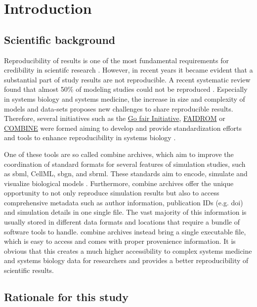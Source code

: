 \section*{Introduction}

\subsection*{Scientific background}
Reproducibility of results is one of the most fundamental requirements for credibility in scientifc research \cite{tiwari2021reproducibility}. However, in recent years it became evident that a substantial part of study results are not reproducible. A recent systematic review found that almost 50\% of modeling studies could not be reproduced \cite{tiwari2021reproducibility}. Especially in systems biology and systems medicine, the increase in size and complexity of models and data-sets proposes new challenges to share reproducible results. Therefore, several initiatives such as the \hyperlink{https://www.go-fair.org/go-fair-initiative/}{Go \acs{fair} Initiative},  \hyperlink{https://fair-dom.org/}{FAIDROM} or \hyperlink{http://co.mbine.org/}{COMBINE} were formed aiming to develop and provide standardization efforts and tools to enhance reproducibility in systems biology \cite{specificationsb}. 

One of these tools are so called \ac{combine} archives, which aim to improve the coordination of standard formats for several features of simulation studies, such as \ac{sbml}, CellML, \ac{sbgn}, and \ac{sbrml}. These standards aim to encode, simulate and visualize biological models \cite{combine}. Furthermore, \ac{combine} archives offer the unique opportunity to not only reproduce simulation results but also to access comprehensive metadata such as author information, publication IDs (e.g. \ac{doi}) and simulation details in one single file. The vast majority of this information is usually stored in different data formats and locations that require a bundle of software tools to handle. \ac{combine} archives instead bring a single executable file, which is easy to access and comes with proper provenience information. It is obvious that this creates a much higher accessibility to complex systems medicine and systems biology data for researchers and provides a better reproducibility of scientific results.

\subsection*{Rationale for this study}
